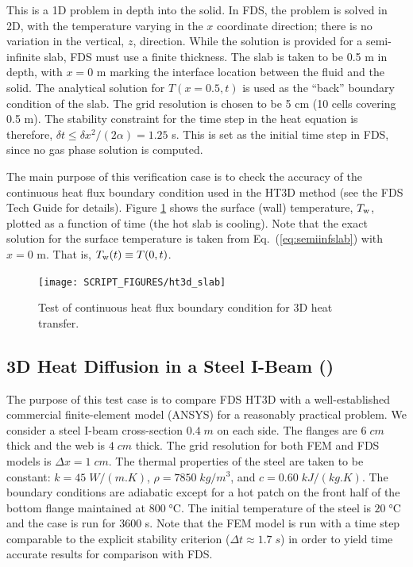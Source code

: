 \documentclass[11pt]{book}
\begin{document}
This is a 1D problem in depth into the solid.  In FDS, the problem is solved in 2D, with the temperature varying in the $x$ coordinate direction; there is no variation in the vertical, $z$, direction.  While the solution is provided for a semi-infinite slab, FDS must use a finite thickness.  The slab is taken to be 0.5 m in depth, with $x=0$ m marking the interface location between the fluid and the solid.  The analytical solution for $T(x=0.5,t)$ is used as the ``back'' boundary condition of the slab.  The grid resolution is chosen to be 5 cm (10 cells covering 0.5 m).  The stability constraint for the time step in the heat equation is therefore, $\delta t \le \delta x^2/(2\alpha) = 1.25$ s.  This is set as the initial time step in FDS, since no gas phase solution is computed.

The main purpose of this verification case is to check the accuracy of the continuous heat flux boundary condition used in the HT3D method (see the FDS Tech Guide \cite{FDS_Math_Guide} for details).  Figure \ref{fig:ht3d_slab} shows the surface (wall) temperature, $T_{\rm w}$, plotted as a function of time (the hot slab is cooling).  Note that the exact solution for the surface temperature is taken from Eq.~(\ref{eq:semiinfslab}) with $x=0$ m.  That is, $T_{\rm w}(t) \equiv T(0,t)$.

\begin{figure}[ht]
\centering
\texttt{[image: SCRIPT\_FIGURES/ht3d\_slab]}
\caption[The  test cases]{Test of continuous heat flux boundary condition for 3D heat transfer.}
\label{fig:ht3d_slab}
\end{figure}

\FloatBarrier

\subsection{3D Heat Diffusion in a Steel I-Beam (\texorpdfstring{}{ht3d\_ibeam})}
\label{ht3d_ibeam}

The purpose of this test case is to compare FDS HT3D with a well-established commercial finite-element model (ANSYS) for a reasonably practical problem.  We consider a steel I-beam cross-section $0.4 \;\si{m}$ on each side.  The flanges are $6 \;\si{cm}$ thick and the web is $4 \;\si{cm}$ thick.  The grid resolution for both FEM and FDS models is $\Delta x = 1 \;\si{cm}$.  The thermal properties of the steel are taken to be constant: $k=45 \;\si{W/(m.K)}$, $\rho=7850 \;\si{kg/m^3}$, and $c = 0.60 \;\si{kJ/(kg.K)}$.  The boundary conditions are adiabatic except for a hot patch on the front half of the bottom flange maintained at $800 \;\si{\degreeCelsius}$.  The initial temperature of the steel is $20 \;\si{\degreeCelsius}$ and the case is run for 3600 s.  Note that the FEM model is run with a time step comparable to the explicit stability criterion ($\Delta t \approx 1.7 \;\si{s}$) in order to yield time accurate results for comparison with FDS.
\end{document}
